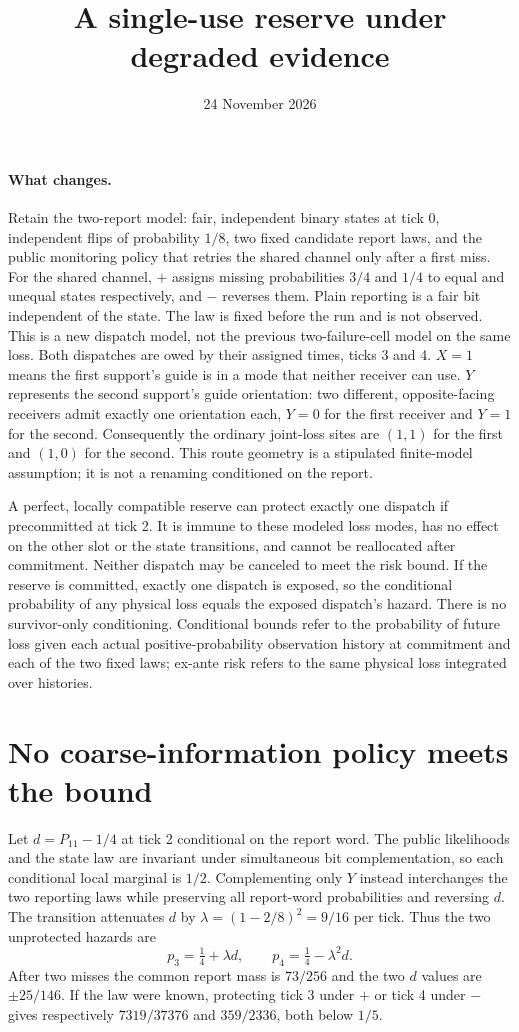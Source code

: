 \documentclass[11pt]{article}
\title{A single-use reserve under degraded evidence}
\author{}
\date{24 November 2026}
\begin{document}
\maketitle
\paragraph{What changes.}
Retain the two-report model: fair, independent binary states at tick 0, independent flips of probability $1/8$, two fixed candidate report laws, and the public monitoring policy that retries the shared channel only after a first miss. For the shared channel, $+$ assigns missing probabilities $3/4$ and $1/4$ to equal and unequal states respectively, and $-$ reverses them. Plain reporting is a fair bit independent of the state. The law is fixed before the run and is not observed. This is a new dispatch model, not the previous two-failure-cell model on the same loss. Both dispatches are owed by their assigned times, ticks 3 and 4. $X=1$ means the first support's guide is in a mode that neither receiver can use. $Y$ represents the second support's guide orientation: two different, opposite-facing receivers admit exactly one orientation each, $Y=0$ for the first receiver and $Y=1$ for the second. Consequently the ordinary joint-loss sites are $(1,1)$ for the first and $(1,0)$ for the second. This route geometry is a stipulated finite-model assumption; it is not a renaming conditioned on the report.

A perfect, locally compatible reserve can protect exactly one dispatch if precommitted at tick 2. It is immune to these modeled loss modes, has no effect on the other slot or the state transitions, and cannot be reallocated after commitment. Neither dispatch may be canceled to meet the risk bound. If the reserve is committed, exactly one dispatch is exposed, so the conditional probability of any physical loss equals the exposed dispatch's hazard. There is no survivor-only conditioning. Conditional bounds refer to the probability of future loss given each actual positive-probability observation history at commitment and each of the two fixed laws; ex-ante risk refers to the same physical loss integrated over histories.

\section{No coarse-information policy meets the bound}
Let $d=P_{11}-1/4$ at tick 2 conditional on the report word. The public likelihoods and the state law are invariant under simultaneous bit complementation, so each conditional local marginal is $1/2$. Complementing only $Y$ instead interchanges the two reporting laws while preserving all report-word probabilities and reversing $d$. The transition attenuates $d$ by $\lambda=(1-2/8)^2=9/16$ per tick. Thus the two unprotected hazards are
\[
p_3=\tfrac14+\lambda d,\qquad
p_4=\tfrac14-\lambda^2d.
\]
After two misses the common report mass is $73/256$ and the two $d$ values are $\pm25/146$. If the law were known, protecting tick 3 under $+$ or tick 4 under $-$ gives respectively $7319/37376$ and $359/2336$, both below $1/5$.
\end{document}
